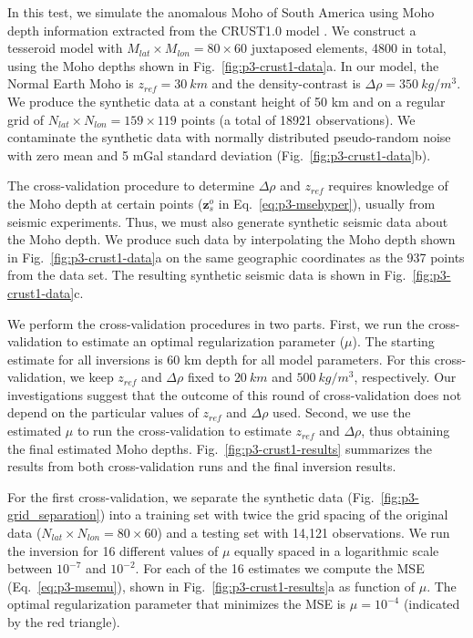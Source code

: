 In this test, we simulate the anomalous Moho of South America
using Moho depth information extracted from the CRUST1.0 model
\citep{laske2013}.
We construct a tesseroid model with
$M_{lat} \times M_{lon} = 80 \times 60$ juxtaposed elements, 4800 in total,
using the Moho depths shown in Fig.~\ref{fig:p3-crust1-data}a.
In our model, the Normal Earth Moho is $z_{ref} = 30\ km$ and
the density-contrast is $\Delta\rho = 350\ kg/m^3$.
We produce the synthetic data at a constant height of 50 km
and on a regular grid of $N_{lat} \times N_{lon} = 159 \times 119$ points
(a total of 18921 observations).
We contaminate the synthetic data with normally distributed pseudo-random noise
with zero mean and 5 mGal standard deviation (Fig.~\ref{fig:p3-crust1-data}b).

The cross-validation procedure to determine $\Delta\rho$ and $z_{ref}$
requires knowledge of the Moho depth at certain points
($\mathbf{z}_s^o$ in Eq.~\ref{eq:p3-msehyper}),
usually from seismic experiments.
Thus, we must also generate synthetic seismic data about the Moho depth.
We produce such data by interpolating the Moho depth shown in
Fig.~\ref{fig:p3-crust1-data}a on the same geographic coordinates
as the 937 points from the \citet{assumpcao2013a} data set.
The resulting synthetic seismic data is shown in Fig.~\ref{fig:p3-crust1-data}c.

We perform the cross-validation procedures in two parts.
First, we run the cross-validation to estimate
an optimal regularization parameter ($\mu$).
The starting estimate for all inversions is
60 km depth for all model parameters.
For this cross-validation,
we keep $z_{ref}$ and $\Delta\rho$ fixed to
$20\ km$ and $500\ kg/m^3$, respectively.
Our investigations suggest that the outcome of this round of cross-validation
does not depend on the particular values of $z_{ref}$ and $\Delta\rho$ used.
Second, we use the estimated $\mu$ to run the cross-validation
to estimate $z_{ref}$ and $\Delta\rho$,
thus obtaining the final estimated Moho depths.
Fig.~\ref{fig:p3-crust1-results} summarizes the results
from both cross-validation runs and the final inversion results.

For the first cross-validation,
we separate the synthetic data (Fig.~\ref{fig:p3-grid_separation}) into
a training set with twice the grid spacing of the original data
($N_{lat} \times N_{lon} = 80 \times 60$)
and a testing set with 14,121 observations.
We run the inversion for 16 different values of $\mu$
equally spaced in a logarithmic scale between $10^{-7}$ and $10^{-2}$.
For each of the 16 estimates we compute the MSE (Eq.~\ref{eq:p3-msemu}),
shown in Fig.~\ref{fig:p3-crust1-results}a as function of $\mu$.
The optimal regularization parameter that minimizes the MSE is $\mu = 10^{-4}$
(indicated by the red triangle).

